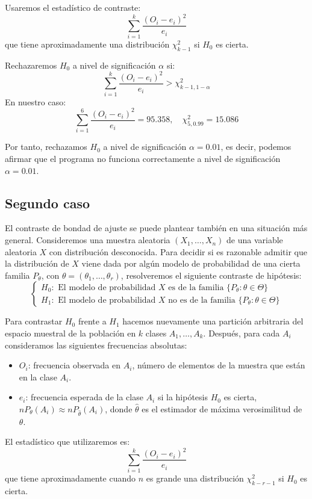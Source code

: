 \begin{example}
    Usaremos el estadístico de contraste:
    $$\sum_{i=1}^k \frac{(O_i-e_i)^2}{e_i}$$
    que tiene aproximadamente una distribución $\chi^2_{k-1}$ si $H_0$ es cierta.

    Rechazaremos $H_0$ a nivel de significación $\alpha$ si:
    $$\sum_{i=1}^k \frac{(O_i-e_i)^2}{e_i} > \chi^2_{k-1, 1-\alpha}$$
    En nuestro caso:
    $$\sum_{i=1}^6 \frac{(O_i-e_i)^2}{e_i} = 95.358, \quad \chi^2_{5, 0.99} = 15.086$$

    Por tanto, rechazamos $H_0$ a nivel de significación $\alpha = 0.01$, es decir, podemos afirmar que el programa no funciona correctamente a nivel de significación $\alpha = 0.01$.
\end{example}

\subsection*{Segundo caso}
El contraste de bondad de ajuste se puede plantear también en una situación más general.
Consideremos una muestra aleatoria $(X_1, \dots, X_n)$ de una variable aleatoria $X$ con distribución desconocida.
Para decidir si es razonable admitir que la distribución de $X$ viene dada por algún modelo de probabilidad de una cierta familia $P_\theta$, con $\theta = (\theta_1, \dots, \theta_r)$, resolveremos el siguiente contraste de hipótesis:
$$\begin{cases}
        H_0: \text{ El modelo de probabilidad } X \text{ es de la familia } \{P_\theta: \theta \in \Theta\} \\
        H_1: \text{ El modelo de probabilidad } X \text{ no es de la familia } \{P_\theta: \theta \in \Theta\}
    \end{cases}$$

Para contrastar $H_0$ frente a $H_1$ hacemos nuevamente una partición arbitraria del espacio muestral de la población en $k$ clases $A_1, \dots, A_k$.
Después, para cada $A_i$ consideramos las siguientes frecuencias absolutas:
\begin{itemize}
    \item $O_i$: frecuencia observada en $A_i$, número de elementos de la muestra que están en la clase $A_i$.
    \item $e_i$: frecuencia esperada de la clase $A_i$ si la hipótesis $H_0$ es cierta, $nP_\theta(A_i) \approx nP_{\hat{\theta}}(A_i)$, donde $\hat{\theta}$ es el estimador de máxima verosimilitud de $\theta$.
\end{itemize}

El estadístico que utilizaremos es:
$$\sum_{i=1}^k \frac{(O_i-e_i)^2}{e_i}$$
que tiene aproximadamente cuando $n$ es grande una distribución $\chi^2_{k-r-1}$ si $H_0$ es cierta.

